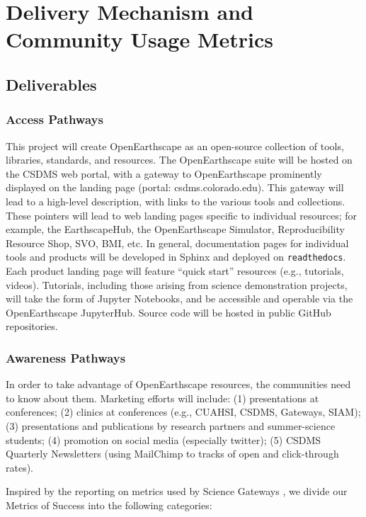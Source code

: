 \section*{Delivery Mechanism and Community Usage Metrics}

\subsection*{Deliverables}

\subsubsection*{Access Pathways}

This project will create OpenEarthscape as an open-source collection of tools, libraries, standards, and resources. The OpenEarthscape suite will be hosted on the CSDMS web portal, with a gateway to OpenEarthscape prominently displayed on the landing page (portal: csdms.colorado.edu). This gateway will lead to a high-level description, with links to the various tools and collections. These pointers will lead to web landing pages specific to individual resources; for example, the EarthscapeHub, the OpenEarthscape Simulator, Reproducibility Resource Shop, SVO, BMI, etc. In general, documentation pages for individual tools and products will be developed in Sphinx and deployed on \texttt{readthedocs}. Each product landing page will feature ``quick start'' resources (e.g., tutorials, videos). Tutorials, including those arising from science demonstration projects, will take the form of Jupyter Notebooks, and be accessible and operable via the OpenEarthscape JupyterHub. Source code will be hosted in public GitHub repositories.

\subsubsection*{Awareness Pathways}

In order to take advantage of OpenEarthscape resources, the communities need to know about them. Marketing efforts will include: (1) presentations at conferences; (2) clinics at conferences (e.g., CUAHSI, CSDMS, Gateways, SIAM); (3) presentations and publications by research partners and summer-science students; (4) promotion on social media (especially twitter); (5) CSDMS Quarterly Newsletters (using MailChimp to tracks of open and click-through rates).

Inspired by the reporting on metrics used by Science Gateways \citep{wilkins2019measuring}, we divide our Metrics of Success into the following categories: %

